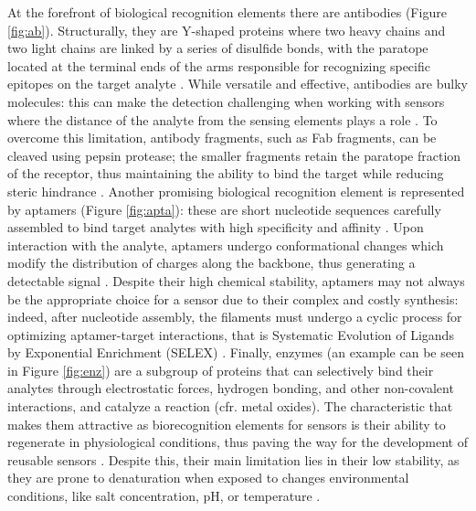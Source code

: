 At the forefront of biological recognition elements there are antibodies (Figure
\ref{fig:ab}). Structurally, they are Y-shaped proteins where two heavy chains
and two light chains are linked by a series of disulfide bonds, with the
paratope located at the terminal ends of the arms responsible for recognizing
specific epitopes on the target analyte \citep{moralesGuide2018}. While
versatile and effective, antibodies are bulky molecules: this can make the
detection challenging when working with sensors where the distance of the
analyte from the sensing elements plays a role \citep{nakatsukaAptamer2018,
shkodraElectrolytegated2021}. To overcome this limitation, antibody fragments,
such as Fab fragments, can be cleaved using pepsin protease; the smaller
fragments retain the paratope fraction of the receptor, thus maintaining the
ability to bind the target while reducing steric hindrance
\citep{crivianu-gaitaAptamers2016}.
%
Another promising biological recognition element is represented by aptamers (Figure \ref{fig:apta}):
these are short nucleotide sequences carefully assembled to bind target analytes
with high specificity and affinity \citep{shkodraElectrolytegated2021}. Upon
interaction with the analyte, aptamers undergo conformational changes which
modify the distribution of charges along the backbone, thus generating a
detectable signal \citep{nakatsukaAptamer2018}. Despite their high chemical
stability, aptamers may not always be the appropriate choice for a sensor due to
their complex and costly synthesis: indeed, after nucleotide assembly, the
filaments must undergo a cyclic process for optimizing aptamer-target
interactions, that is Systematic Evolution of Ligands by Exponential Enrichment
(SELEX) \citep{ellingtonVitro1990, tuerkSystematic1990}.
%
Finally, enzymes (an example can be seen in Figure \ref{fig:enz}) are a subgroup
of proteins that can selectively bind their analytes through electrostatic
forces, hydrogen bonding, and other non-covalent interactions, and catalyze a
reaction (cfr. metal oxides). The characteristic that makes them attractive as
biorecognition elements for sensors is their ability to regenerate in
physiological conditions, thus paving the way for the development of reusable
sensors \citep{bocanegra-rodriguezNew2020}. Despite this, their main limitation
lies in their low stability, as they are prone to denaturation when exposed to
changes environmental conditions, like salt concentration, pH, or temperature
\citep{herletNew2017}.

